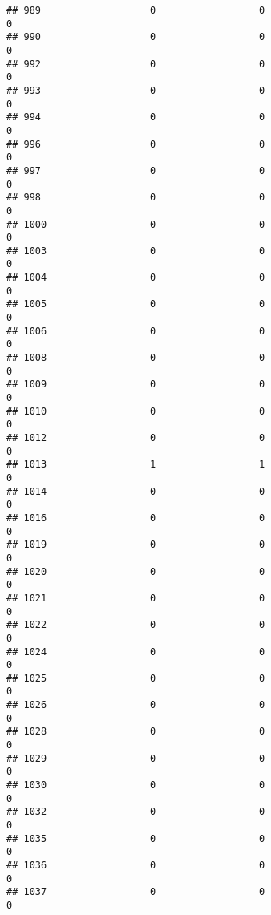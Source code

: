 \documentclass[
]{article}
\begin{document}
\begin{verbatim}
## 989                   0                  0                              0
## 990                   0                  0                              0
## 992                   0                  0                              0
## 993                   0                  0                              0
## 994                   0                  0                              0
## 996                   0                  0                              0
## 997                   0                  0                              0
## 998                   0                  0                              0
## 1000                  0                  0                              0
## 1003                  0                  0                              0
## 1004                  0                  0                              0
## 1005                  0                  0                              0
## 1006                  0                  0                              0
## 1008                  0                  0                              0
## 1009                  0                  0                              0
## 1010                  0                  0                              0
## 1012                  0                  0                              0
## 1013                  1                  1                              0
## 1014                  0                  0                              0
## 1016                  0                  0                              0
## 1019                  0                  0                              0
## 1020                  0                  0                              0
## 1021                  0                  0                              0
## 1022                  0                  0                              0
## 1024                  0                  0                              0
## 1025                  0                  0                              0
## 1026                  0                  0                              0
## 1028                  0                  0                              0
## 1029                  0                  0                              0
## 1030                  0                  0                              0
## 1032                  0                  0                              0
## 1035                  0                  0                              0
## 1036                  0                  0                              0
## 1037                  0                  0                              0

\end{verbatim}
\end{document}

